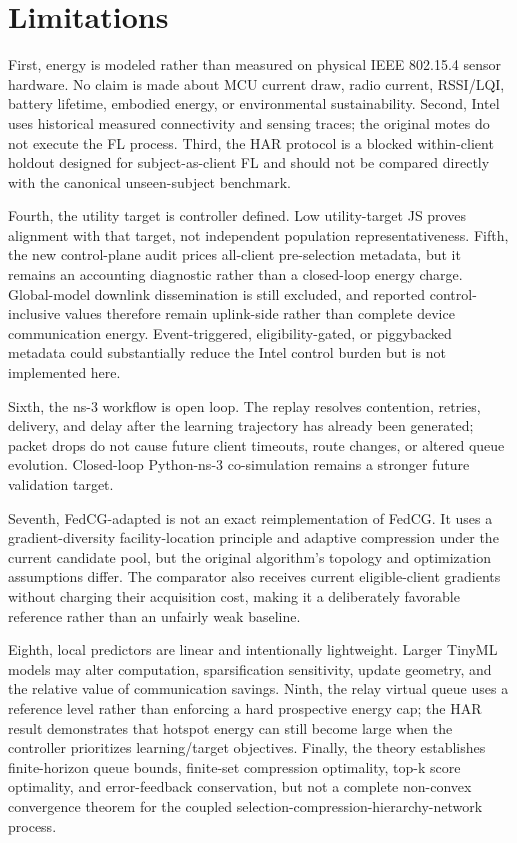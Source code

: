 \documentclass[11pt]{article}
\begin{document}
\section{Limitations}
First, energy is modeled rather than measured on physical IEEE 802.15.4 sensor hardware. No claim is made about MCU current draw, radio current, RSSI/LQI, battery lifetime, embodied energy, or environmental sustainability. Second, Intel uses historical measured connectivity and sensing traces; the original motes do not execute the FL process. Third, the HAR protocol is a blocked within-client holdout designed for subject-as-client FL and should not be compared directly with the canonical unseen-subject benchmark.\par
Fourth, the utility target is controller defined. Low utility-target JS proves alignment with that target, not independent population representativeness. Fifth, the new control-plane audit prices all-client pre-selection metadata, but it remains an accounting diagnostic rather than a closed-loop energy charge. Global-model downlink dissemination is still excluded, and reported control-inclusive values therefore remain uplink-side rather than complete device communication energy. Event-triggered, eligibility-gated, or piggybacked metadata could substantially reduce the Intel control burden but is not implemented here.\par
Sixth, the ns-3 workflow is open loop. The replay resolves contention, retries, delivery, and delay after the learning trajectory has already been generated; packet drops do not cause future client timeouts, route changes, or altered queue evolution. Closed-loop Python-ns-3 co-simulation remains a stronger future validation target.\par
Seventh, FedCG-adapted is not an exact reimplementation of FedCG. It uses a gradient-diversity facility-location principle and adaptive compression under the current candidate pool, but the original algorithm's topology and optimization assumptions differ. The comparator also receives current eligible-client gradients without charging their acquisition cost, making it a deliberately favorable reference rather than an unfairly weak baseline.\par
Eighth, local predictors are linear and intentionally lightweight. Larger TinyML models may alter computation, sparsification sensitivity, update geometry, and the relative value of communication savings. Ninth, the relay virtual queue uses a reference level rather than enforcing a hard prospective energy cap; the HAR result demonstrates that hotspot energy can still become large when the controller prioritizes learning/target objectives. Finally, the theory establishes finite-horizon queue bounds, finite-set compression optimality, top-k score optimality, and error-feedback conservation, but not a complete non-convex convergence theorem for the coupled selection-compression-hierarchy-network process.\par
\end{document}
